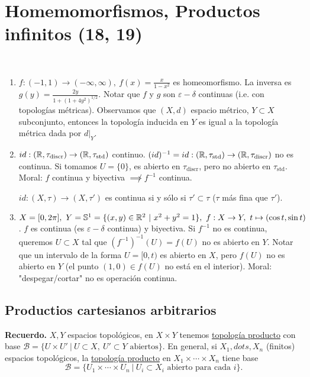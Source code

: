 \section{Homemomorfismos, Productos infinitos (18, 19)}

\begin{eg}~
	\begin{enumerate}
		\item $f: (-1,1) \to (-\infty,\infty),\ f(x) = \frac{x}{1-x^2}$ es homeomorfismo. La inversa es $g(y) = \frac{2y}{1+(1+4y^2)^{1/2}}$. Notar que $f$ y $g$ son $\varepsilon-\delta$ continuas (i.e. con topologías métricas). Observamos que $(X,d)$ espacio métrico, $Y\subset X$ subconjunto, entonces la topología inducida en $Y$ es igual a la topología métrica dada por $d|_{Y}$.

		\item $id : (\mathbb{R},\tau_{\text{discr}})\to(\mathbb{R},\tau_{\text{std}})$ continuo. $(id)^{-1} = id: (\mathbb{R},\tau_{\text{std}}) \to (\mathbb{R}, \tau_{\text{discr}})$ no es continua. Si tomamos $U = \{0\}$, es abierto en $\tau_{\text{discr}}$, pero no abierto en $\tau_{\text{std}}$. Moral: $f$ continua y biyectiva $\not\implies f^{-1}$ continua. 
		\begin{remark}
			$id: (X,\tau) \to (X,\tau')$ es continua si y sólo si $\tau' \subset \tau$ ($\tau$ más fina que $\tau'$).
		\end{remark}

		\item $X = [0,2\pi],\ Y = \mathbb{S}^1 = \{(x,y) \in \mathbb{R}^2 \ | \ x^2 + y^2 = 1 \},\ f: X \to Y,\ t \mapsto (\cos t,\sin t)$. $f$ es continua (es $\varepsilon-\delta$ continua) y biyectiva. Si $f^{-1}$ no es continua, queremos $U\subset X$ tal que $(f^{-1})^{-1}(U) = f(U)$ no es abierto en $Y$. Notar que un intervalo de la forma $U = [0,t)$ es abierto en $X$, pero $f(U)$ no es abierto en $Y$ (el punto $(1,0) \in f(U)$ no está en el interior). Moral: "despegar/cortar" no es operación continua.
	\end{enumerate}
\end{eg}

\subsection{Productios cartesianos arbitrarios}

\noindent \textbf{Recuerdo.} $X,Y$ espacios topológicos, en $X\times Y$ tenemos \underline{topología producto} con base $\mathcal{B} = \{ U\times U' \ | \ U \subset X,\ U'\subset Y \text{ abiertos} \}$. En general, si $X_1,dots,X_n$ (finitos) espacios topológicos, la \underline{topología producto} en $X_1\times \cdots \times X_n$ tiene base
\[ \mathcal{B} = \{ U_1 \times \cdots \times U_n \ | \ U_i \subset X_i \text{ abierto para cada } i \}. \]

